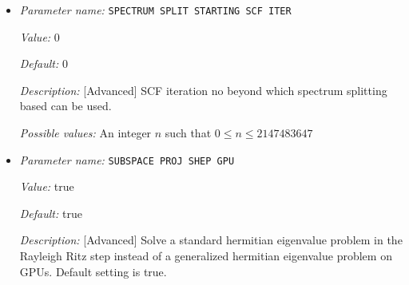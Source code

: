 \begin{itemize}
{\it Value:} 0


{\it Default:} 0


{\it Description:} [Advanced] Number of lowest Kohn-Sham eigenstates which should not be included in the Rayleigh-Ritz diagonalization.  In other words, only the eigenvalues and eigenvectors corresponding to the higher eigenstates (Number of Kohn-Sham wavefunctions minus the specified core eigenstates) are computed in the diagonalization of the projected Hamiltonian. This value is usually chosen to be the sum of the number of core eigenstates for each atom type multiplied by number of atoms of that type. This setting is recommended for large systems (greater than 5000 electrons). Default value is 0 i.e., no core eigenstates are excluded from the Rayleigh-Ritz projection step.


{\it Possible values:} An integer $n$ such that $0\leq n \leq 2147483647$
\item {\it Parameter name:} {\tt SPECTRUM SPLIT STARTING SCF ITER}
\label{parameters:SCF parameters/Eigen_2dsolver parameters/SPECTRUM SPLIT STARTING SCF ITER}
\label{parameters:SCF_20parameters/Eigen_2dsolver_20parameters/SPECTRUM_20SPLIT_20STARTING_20SCF_20ITER}


{\it Value:} 0


{\it Default:} 0


{\it Description:} [Advanced] SCF iteration no beyond which spectrum splitting based can be used.


{\it Possible values:} An integer $n$ such that $0\leq n \leq 2147483647$
\item {\it Parameter name:} {\tt SUBSPACE PROJ SHEP GPU}
\label{parameters:SCF parameters/Eigen_2dsolver parameters/SUBSPACE PROJ SHEP GPU}
\label{parameters:SCF_20parameters/Eigen_2dsolver_20parameters/SUBSPACE_20PROJ_20SHEP_20GPU}


{\it Value:} true


{\it Default:} true


{\it Description:} [Advanced] Solve a standard hermitian eigenvalue problem in the Rayleigh Ritz step instead of a generalized hermitian eigenvalue problem on GPUs. Default setting is true.



\end{itemize}

